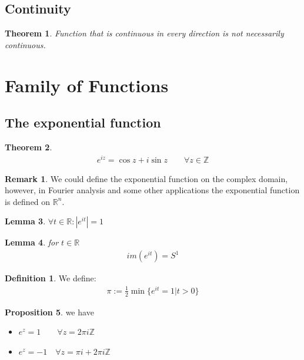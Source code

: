 \documentclass[12pt,fleqn]{book}
\newtheorem{theorem}{Theorem}[section]
\newtheorem{lemma}[theorem]{Lemma}
\theoremstyle{definition}
\newtheorem{definition}{Definition}[section]
\newtheorem*{remark}{Remark}
\newtheorem{proposition}[theorem]{Proposition}
\begin{document}
\subsection{Continuity}
\begin{theorem}
	Function that is continuous in every direction is not necessarily continuous. 
\end{theorem}




\section{Family of Functions}
\subsection{The exponential function}
\begin{theorem}
	\begin{align*}
		e^{iz} = \cos z + i \sin z \qquad \forall z \in \mathbb{Z}
	\end{align*}
\end{theorem}
\begin{remark}
We could define the exponential function on the complex domain, however, in Fourier analysis and some other applications the exponential function is defined on $\mathbb{R}^n$.	
\end{remark}

\begin{lemma}
	$\forall t \in \mathbb{R}: |e^{it}|=1$
\end{lemma}

\begin{lemma}
for $t \in \mathbb{R}$
\begin{align*}
 im(e^{it}) = S^1
\end{align*}
\end{lemma}

\begin{definition}
	We define:
	\begin{align*}
		\pi := \frac{1}{2} \min \{ e^{it} = 1| t > 0\}
	\end{align*}
\end{definition}

\begin{proposition}
	we have
	\begin{itemize}
		\item $e^z = 1 \qquad \forall z = 2\pi i\mathbb{Z}$
		\item $e^z = -1 \quad \forall z = \pi i + 2\pi i \mathbb{Z}$
	\end{itemize}
\end{proposition}
\end{document}
